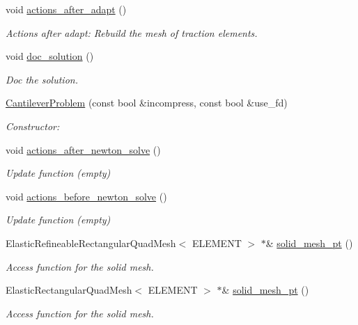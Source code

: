 \begin{DoxyCompactItemize}
void \hyperlink{classCantileverProblem_af4d135ace3eac657b38de362e1644c75}{actions\+\_\+after\+\_\+adapt} ()
\begin{DoxyCompactList}\small\item\em Actions after adapt\+: Rebuild the mesh of traction elements. \end{DoxyCompactList}\item 
void \hyperlink{classCantileverProblem_a7571348f8724e71be4e67dc64cea3877}{doc\+\_\+solution} ()
\begin{DoxyCompactList}\small\item\em Doc the solution. \end{DoxyCompactList}\item 
\hyperlink{classCantileverProblem_a83b396aa3bd0c2d9a491c605c208de83}{Cantilever\+Problem} (const bool \&incompress, const bool \&use\+\_\+fd)
\begin{DoxyCompactList}\small\item\em Constructor\+: \end{DoxyCompactList}\item 
void \hyperlink{classCantileverProblem_a4a70a4328d287aaa15c7811562122013}{actions\+\_\+after\+\_\+newton\+\_\+solve} ()
\begin{DoxyCompactList}\small\item\em Update function (empty) \end{DoxyCompactList}\item 
void \hyperlink{classCantileverProblem_a293902b825898ce043ffce3f0691f5a5}{actions\+\_\+before\+\_\+newton\+\_\+solve} ()
\begin{DoxyCompactList}\small\item\em Update function (empty) \end{DoxyCompactList}\item 
Elastic\+Refineable\+Rectangular\+Quad\+Mesh$<$ E\+L\+E\+M\+E\+NT $>$ $\ast$\& \hyperlink{classCantileverProblem_a26843782873897ee5e45647d17204b86}{solid\+\_\+mesh\+\_\+pt} ()
\begin{DoxyCompactList}\small\item\em Access function for the solid mesh. \end{DoxyCompactList}\item 
Elastic\+Rectangular\+Quad\+Mesh$<$ E\+L\+E\+M\+E\+NT $>$ $\ast$\& \hyperlink{classCantileverProblem_a63d315bcebba1a439e4b5ec0fec5b6ab}{solid\+\_\+mesh\+\_\+pt} ()
\begin{DoxyCompactList}\small\item\em Access function for the solid mesh. \end{DoxyCompactList}\item 

\end{DoxyCompactItemize}
